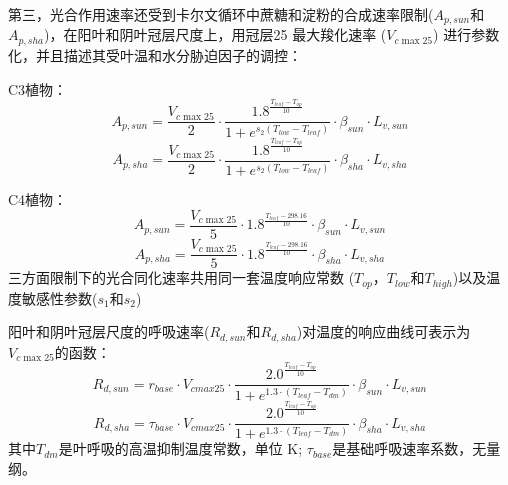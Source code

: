 第三，光合作用速率还受到卡尔文循环中蔗糖和淀粉的合成速率限制($A_{p,sun}$和$A_{p,sha}$)，在阳叶和阴叶冠层尺度上，用冠层25 \textcelsius 最大羧化速率 ($V_{c \max25}$) 进行参数化，并且描述其受叶温和水分胁迫因子的调控：

C3植物：
\begin{equation}\label{A_e_a_sun}
A_{p,sun}=\frac{V_{c \max 25}}{2} \cdot \frac{1.8^{\frac{T_{{leaf }}-T_{o p}}{10}}}{1+e^{s_{2}\left(T_{{low }}-T_{{leaf }}\right)}} \cdot \beta_{sun} \cdot L_{v,sun}
\end{equation}
\begin{equation}\label{A_e_a_sha}
A_{p,sha}=\frac{V_{c \max 25}}{2} \cdot \frac{1.8^{\frac{T_{{leaf }}-T_{o p}}{10}}}{1+e^{s_{2}\left(T_{{low }}-T_{{leaf }}\right)}} \cdot \beta_{sha} \cdot L_{v,sha}
\end{equation}

C4植物：
\begin{equation}\label{A_e_b_sun}
A_{p,sun}=\frac{V_{c \max 25}}{5} \cdot 1.8^{\frac{T_{{leaf }}-298.16}{10}} \cdot \beta_{sun} \cdot L_{v,sun}
\end{equation}
\begin{equation}\label{A_e_b_sha}
A_{p,sha}=\frac{V_{c \max 25}}{5} \cdot 1.8^{\frac{T_{{leaf }}-298.16}{10}} \cdot \beta_{sha} \cdot L_{v,sha}
\end{equation}
三方面限制下的光合同化速率共用同一套温度响应常数 ($T_{op}$，$T_{low}$和$T_{high}$)以及温度敏感性参数($s_1$和$s_2$)


阳叶和阴叶冠层尺度的呼吸速率($R_{d,sun}$和$R_{d,sha}$)对温度的响应曲线可表示为$V_{c \max25}$的函数：
\begin{equation}\label{R_d1_sun}
R_{d,sun}=r_{{base }} \cdot V_{cmax 25} \cdot \frac{2.0^{\frac{T_{leaf}-T_{op}}{10}}}{1+e^{1.3 \cdot\left(T_{leaf}-T_{d m}\right)}} \cdot \beta_{sun} \cdot L_{v,sun}
\end{equation}
\begin{equation}\label{R_d1_sha}
R_{d,sha}=\tau_{{base }} \cdot V_{cmax 25} \cdot \frac{2.0^{\frac{T_{leaf}-T_{op}}{10}}}{1+e^{1.3 \cdot\left(T_{leaf}-T_{d m}\right)}} \cdot \beta_{sha} \cdot L_{v,sha}
\end{equation}
其中$T_{dm}$是叶呼吸的高温抑制温度常数，单位 K; $\tau_{base}$是基础呼吸速率系数，无量纲。

